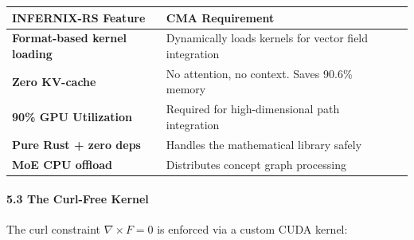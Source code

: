 \documentclass[
  11pt,
  a4paper,
]{article}
\begin{document}
\begin{longtable}[]{@{}
  >{\raggedright\arraybackslash}p{}
  >{\raggedright\arraybackslash}p{}
  >{\raggedright\arraybackslash}p{}@{}}
\toprule\noalign{}
\begin{minipage}[b]{\linewidth}\raggedright
INFERNIX-RS Feature
\end{minipage} & \begin{minipage}[b]{\linewidth}\raggedright
CMA Requirement
\end{minipage} & \begin{minipage}[b]{\linewidth}\raggedright
\end{minipage} \\
\midrule\noalign{}
\endhead
\bottomrule\noalign{}
\endlastfoot
\textbf{Format-based kernel loading} & Dynamically loads kernels for
vector field integration & \\
\textbf{Zero KV-cache} & No attention, no context. Saves 90.6\% memory
& \\
\textbf{90\% GPU Utilization} & Required for high-dimensional path
integration & \\
\textbf{Pure Rust + zero deps} & Handles the mathematical library safely
& \\
\textbf{MoE CPU offload} & Distributes concept graph processing & \\
\end{longtable}

\paragraph{5.3 The Curl-Free Kernel}\label{the-curl-free-kernel}

The curl constraint \(\nabla \times F = 0\) is enforced via a custom
CUDA kernel:
\end{document}
